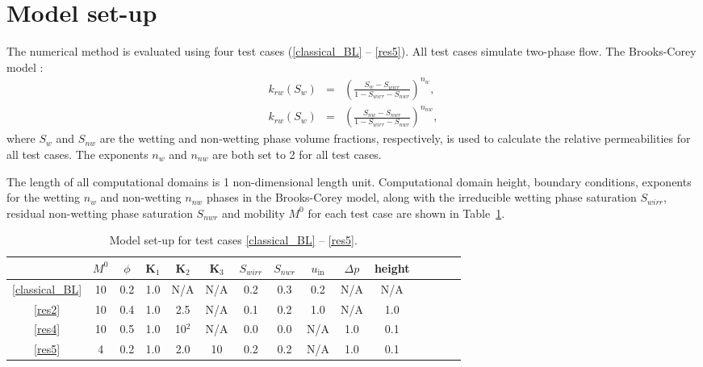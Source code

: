 \documentclass[times]{fldauth}
\begin{document}
\section{Model set-up}\label{setup}
The numerical method is evaluated using four test cases (\ref{classical_BL} --
\ref{res5}). All test cases simulate two-phase flow. The Brooks-Corey model
\cite{brooks_1964}: 
\begin{eqnarray}
k_{rw}\left ( S_{w} \right ) &=& \left ( \frac{S_w-S_{wirr}}{1-S_{wirr}-S_{nwr}} \right )^{n_w}, \\
k_{rw}\left ( S_{w} \right ) &=& \left ( \frac{S_{nw}-S_{nwr}}{1-S_{wirr}-S_{nwr}} \right)^{n_{nw}}, 
\end{eqnarray}
where $S_w$ and $S_{nw}$ are the wetting and non-wetting phase volume
fractions, respectively, is used to calculate the relative
permeabilities for all test cases. The exponents $n_w$ and $n_{nw}$
are both set to 2 for all test cases.

The length of all computational domains is 1 non-dimensional length
unit. Computational domain height, boundary conditions, exponents for
the wetting $n_w$ and non-wetting $n_{nw}$ phases in the Brooks-Corey
model, along with the irreducible wetting phase saturation $S_{wirr}$,
residual non-wetting phase saturation $S_{nwr}$ and mobility $M^0$ for
each test case are shown in Table~\ref{tab:1}.

\begin{table}[h!]
  \centering
  \small{
    \caption{Model set-up for test cases \ref{classical_BL} --
      \ref{res5}.\label{tab:1}}
    \begin{tabular}{c c c c c c c c c c c c c c c} 
      \hline
      & $M^0$ & $\phi$ & $\mathbf{K}_\text{1}$ & $\mathbf{K}_\text{2}$ & $\mathbf{K}_\text{3}$ & $S_{wirr}$ & $S_{nwr}$ & $u_{\mathrm{in}}$ & $\Delta p$ & height \\ \hline
      \ref{classical_BL} & 10 & 0.2 & 1.0 & N/A    & N/A & 0.2   & 0.3 & 0.2 & N/A & N/A\\
      \ref{res2}         & 10 & 0.4 & 1.0 & 2.5    & N/A & 0.1   & 0.2 & 1.0 & N/A & 1.0\\ 
      \ref{res4}         & 10 & 0.5 & 1.0 & 10$^2$ & N/A & 0.0   & 0.0 & N/A & 1.0 & 0.1\\
      \ref{res5}         & 4  & 0.2 & 1.0 & 2.0    & 10  & 0.2   & 0.2 & N/A & 1.0 & 0.1\\ \hline
    \end{tabular}
  }
\end{table}
\end{document}
